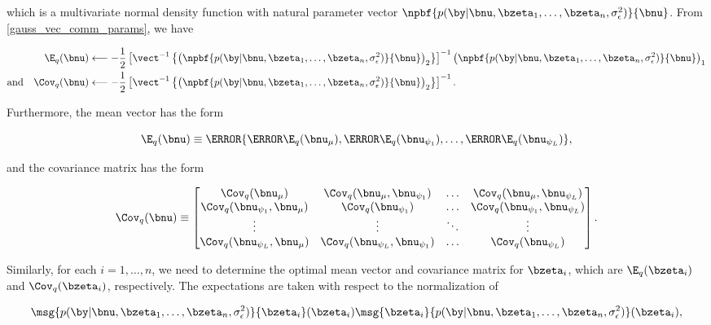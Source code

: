 \documentclass[12pt]{article}
\def\sigsqeps{\sigma^2_{\epsilon}}
\def\numu{\bnu_\mu}
\newcommand\nupsi[1]{\bnu_{\psi_{#1}}}
\theoremstyle{plain}
\theoremstyle{definition}
\theoremstyle{remark}
\begin{document}
\noindent which is a multivariate normal density function with natural parameter vector $\npbf{p (\by | \bnu, \bzeta_1,
\dots, \bzeta_n, \sigsqeps)}{\bnu}$. From \eqref{gauss_vec_comm_params}, we have

\begin{align}
\begin{split}
	\E_q (\bnu)
		&\longleftarrow
			-\frac12 \left[
				\vect^{-1} \left\{
					\left( \npbf{p (\by | \bnu, \bzeta_1, \dots, \bzeta_n, \sigsqeps)}{\bnu} \right)_2
				\right\}
			\right]^{-1} \left( \npbf{p (\by | \bnu, \bzeta_1, \dots, \bzeta_n, \sigsqeps)}{\bnu} \right)_1 \\
	\text{and} \quad
	\Cov_q (\bnu)
		&\longleftarrow
			-\frac12 \left[
				\vect^{-1} \left\{
					\left( \npbf{p (\by | \bnu, \bzeta_1, \dots, \bzeta_n, \sigsqeps)}{\bnu} \right)_2
				\right\}
			\right]^{-1}.
\end{split}
\label{mom_lik_nu}
\end{align}

\noindent Furthermore, the mean vector has the form

\begin{equation}
	\E_q (\bnu) \equiv \T{
		\left\{ \T{\E_q (\numu)}, \T{\E_q (\nupsi{1})}, \dots, \T{\E_q (\nupsi{L})} \right\}
	},
\label{exp_lik_nu}
\end{equation}

\noindent and the covariance matrix has the form

\begin{equation}
	\Cov_q (\bnu) \equiv \begin{bmatrix}
		\Cov_q (\numu) & \Cov_q (\numu, \nupsi{1}) & \dots & \Cov_q (\numu, \nupsi{L}) \\
		\Cov_q (\nupsi{1}, \numu) & \Cov_q (\nupsi{1}) & \dots & \Cov_q (\nupsi{1}, \nupsi{L}) \\
		\vdots & \vdots & \ddots & \vdots \\
		\Cov_q (\nupsi{L}, \numu) & \Cov_q (\nupsi{L}, \nupsi{1}) & \dots & \Cov_q (\nupsi{L}) \\
	\end{bmatrix}.
\label{cov_lik_nu}
\end{equation}

\noindent Similarly, for each $i = 1, \dots, n$, we need to determine the optimal mean vector and covariance matrix
for $\bzeta_i$, which are $\E_q (\bzeta_i)$ and $\Cov_q (\bzeta_i)$, respectively. The expectations are taken with
respect to the normalization of

\[
	\msg{p (\by | \bnu, \bzeta_1, \dots, \bzeta_n, \sigsqeps)}{\bzeta_i} (\bzeta_i)
	\msg{\bzeta_i}{p (\by | \bnu, \bzeta_1, \dots, \bzeta_n, \sigsqeps)} (\bzeta_i),
\]
\end{document}
